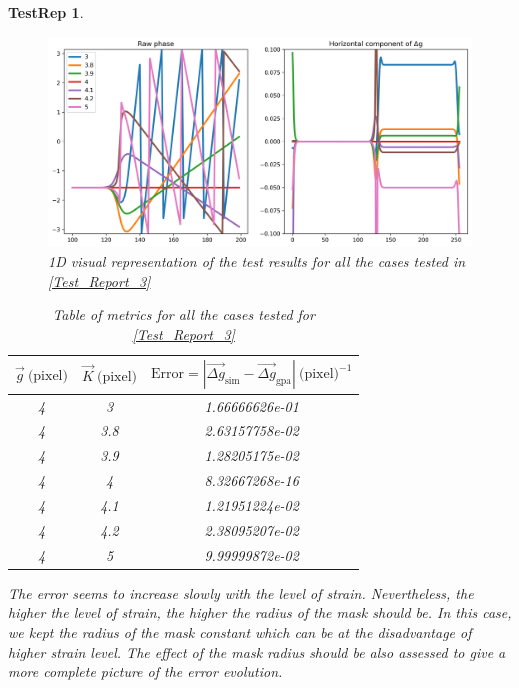 \documentclass[12pt, titlepage]{article}
\newtheorem{TestRep}{TestRep}
\begin{document}
\begin{TestRep}
\begin{figure}[H]
\begin{center}
\includegraphics[scale=0.5]{Figures/Test_3_test_results.png}
\caption{1D visual representation of the test results for all the cases tested 
in \cref{Test_Report_3}}
\label{fig:Test_3_test_results}
\end{center}
\end{figure}

\begin{table}[H]
\centering
\begin{tabular}{|c|c|c|}
\hline
$\overrightarrow{g} \ \text{(pixel)}$ & $\overrightarrow{K} \ \text{(pixel)}$ & 
$\text{Error}=|\overrightarrow{\Delta g}_{\text{sim}}-\overrightarrow{\Delta 
g}_{\text{gpa}}| \ \text{(pixel)}^{-1}$ \\
\hline
4 & 3 & 1.66666626e-01 \\ \hline
4 & 3.8 & 2.63157758e-02 \\ \hline
4 & 3.9 & 1.28205175e-02 \\ \hline
4 & 4 & 8.32667268e-16 \\ \hline
4 & 4.1 & 1.21951224e-02 \\ \hline
4 & 4.2 & 2.38095207e-02 \\ \hline
4 & 5 & 9.99999872e-02 \\ \hline
\end{tabular}
\caption{Table of metrics for all the cases tested for 
\cref{Test_Report_3}}\label{tb:Metric_test_3_multi_case}
\end{table}

The error seems to increase slowly with the level of strain. Nevertheless, the 
higher the level of strain, the higher the radius of the mask should be. In this 
case, we kept the radius of the mask constant which can be at the disadvantage 
of higher strain level. The effect of the mask radius should be also assessed to 
give a more complete picture of the error evolution.
\end{TestRep}
\end{document}
